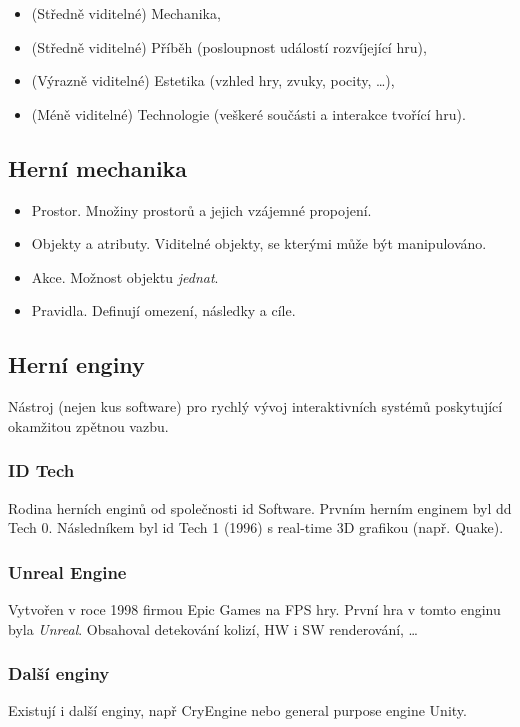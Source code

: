 \begin{itemize}
    \item (Středně viditelné) Mechanika,
    \item (Středně viditelné) Příběh (posloupnost událostí rozvíjející hru),
    \item (Výrazně viditelné) Estetika (vzhled hry, zvuky, pocity, \dots),
    \item (Méně viditelné) Technologie (veškeré součásti a interakce tvořící hru).
\end{itemize}

\subsection*{Herní mechanika}

\begin{itemize}
    \item Prostor. Množiny prostorů a jejich vzájemné propojení.
    \item Objekty a atributy. Viditelné objekty, se kterými může být manipulováno.
    \item Akce. Možnost objektu \textit{jednat}.
    \item Pravidla. Definují omezení, následky a cíle.
\end{itemize}

\subsection*{Herní enginy}

Nástroj (nejen kus software) pro rychlý vývoj interaktivních systémů poskytující okamžitou zpětnou vazbu.

\subsubsection*{ID Tech}

Rodina herních enginů od společnosti id Software.
Prvním herním enginem byl dd Tech 0.
Následníkem byl id Tech 1 (1996) s real-time 3D grafikou (např. Quake).

\subsubsection*{Unreal Engine}

Vytvořen v roce 1998 firmou Epic Games na FPS hry.
První hra v tomto enginu byla \textit{Unreal}.
Obsahoval detekování kolizí, HW i SW renderování, \dots

\subsubsection*{Další enginy}

Existují i další enginy, např CryEngine nebo general purpose engine Unity.